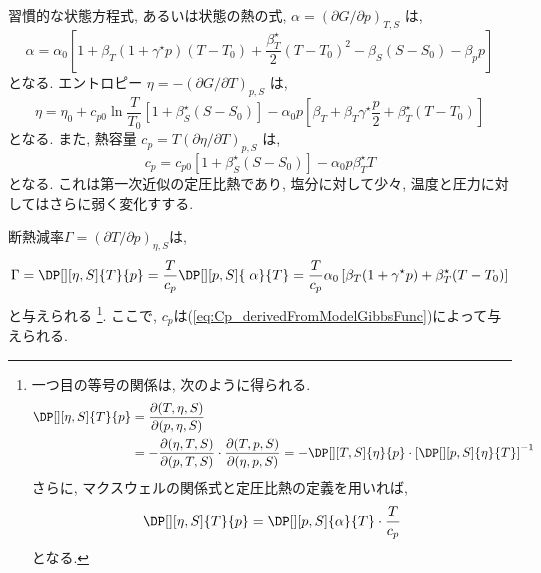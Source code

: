 習慣的な状態方程式, あるいは状態の熱の式, 
$\alpha = \left(\partial G/\partial p\right)_{T,S}$
は, 
\begin{equation}
 \alpha = \alpha_0 \left[
  1 + \beta_T(1+\gamma^\star p)(T-T_0) + \dfrac{\beta_T^\star}{2}(T-T_0)^2
   - \beta_S(S-S_0) - \beta_p p
 \right]
 \label{eq:conventional_EOS_derivedFromMOdelGibbsFunc}
\end{equation}
となる. 
エントロピー
$\eta = - \left(\partial G/\partial T\right)_{p,S}$
は, 
\begin{equation}
 \eta = \eta_0 + c_{p0} \ln{\dfrac{T}{T_0}} \left[1 + \beta_S^\star (S-S_0) \right]
        -\alpha_0 p \left[ \beta_T + \beta_T \gamma^\star \dfrac{p}{2} + \beta_T^\star (T-T_0) \right]
\label{eq:entropy_derivedFromModelGibbsFunc}
\end{equation}
となる. 
また, 熱容量
$c_p  = T \left(\partial \eta/\partial T\right)_{p,S}$
は, 
\begin{equation}
 c_p = c_{p0} \left[1 + \beta_S^\star (S-S_0) \right]
       - \alpha_0 p \beta_T^\star T
\label{eq:Cp_derivedFromModelGibbsFunc}
\end{equation}
となる. 
これは第一次近似の定圧比熱であり, 
塩分に対して少々, 温度と圧力に対してはさらに弱く変化すする. 

断熱減率$\Gamma = \left(\partial T/\partial p \right)_{\eta,S}$は, 
\begin{equation}
 \Gamma = \DP[][\eta,S]{T}{p} = \dfrac{T}{c_p}\DP[][p,S]{\;\alpha}{T}
  = \dfrac{T}{c_p} \alpha_0 \left[ \beta_T (1+\gamma^\star p) + \beta_T^\star (T-T_0) \right]
\end{equation}
と与えられる%
\footnote{
一つ目の等号の関係は, 次のように得られる. 
\begin{equation*}
\begin{split}
 \DP[][\eta,S]{T}{p} &= \dfrac{\partial (T,\eta,S)}{\partial (p,\eta,S)} \\
  &= - \dfrac{\partial (\eta,T,S)}{\partial(p,T,S)} \cdot \dfrac{\partial (T,p,S)}{\partial (\eta,p,S)}
   = - \DP[][T,S]{\eta}{p} \cdot \left[ \DP[][p,S]{\eta}{T} \right]^{-1} 
\end{split}
\end{equation*}
さらに, マクスウェルの関係式と定圧比熱の定義を用いれば, 
\begin{equation*}
 \DP[][\eta,S]{T}{p} = \DP[][p,S]{\alpha}{T} \cdot \dfrac{T}{c_p} 
\end{equation*}
となる. 
}. 
ここで, $c_p$は(\ref{eq:Cp_derivedFromModelGibbsFunc})によって与えられる. 


